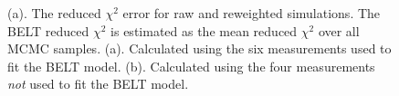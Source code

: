 \documentclass[journal=jacsat,manuscript=article]{achemso}
\begin{document}
\begin{figure}
\caption{
(a).  The reduced $\chi^2$ error for raw and reweighted simulations.  The BELT reduced $\chi^2$ is estimated as the mean reduced $\chi^2$ over all MCMC samples.  (a).  Calculated using the six measurements used to fit the BELT model.  (b).  Calculated using the four measurements \emph{not} used to fit the BELT model.
}
\label{figure:ChiSquared}
\end{figure}
\end{document}
